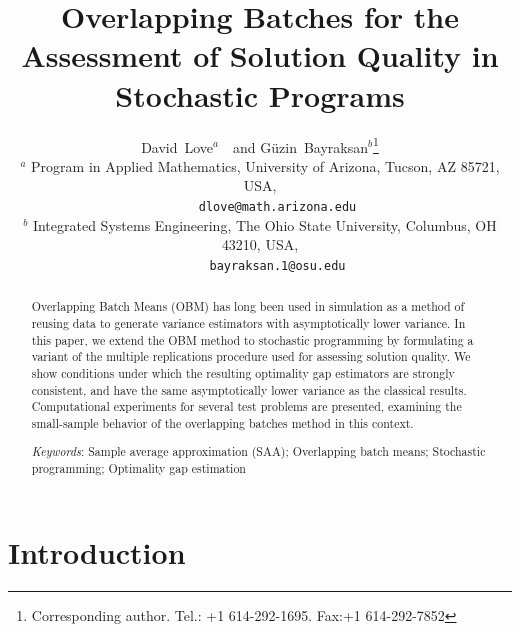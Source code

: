 \documentclass[12pt]{article}
\newcommand{\Keywords}[1]{\par\noindent 
{\small{\em Keywords\/}: #1}}
\begin{document}
\title{Overlapping Batches for the Assessment of Solution Quality in Stochastic Programs}

\author{David~Love$^{a}$\ \ and G\"{u}zin~Bayraksan$^{b}$\thanks{Corresponding author. Tel.: +1 614-292-1695. Fax:+1 614-292-7852}\\[6pt]
{\small
      $^{a}$ Program in Applied Mathematics, University of Arizona, Tucson, AZ 85721, USA,}\\
{\small \ \ \ \ \ \texttt{dlove@math.arizona.edu}} \\
{\small 
      $^{b}$ Integrated Systems Engineering, The Ohio State University, Columbus, OH 43210, USA,}\\
{\small \ \ \ \  \   \texttt{bayraksan.1@osu.edu}}}
\date{}

\maketitle

\begin{abstract}
\noindent Overlapping Batch Means (OBM) has long been used in simulation as a method of reusing data to generate variance estimators with asymptotically lower variance.
In this paper, we extend the OBM method to stochastic programming by formulating a variant of the multiple replications procedure used for assessing solution quality.
We show conditions under which the resulting optimality gap estimators are strongly consistent, and have the same asymptotically lower variance as the classical results.
Computational experiments for several test problems are presented, examining the small-sample behavior of the overlapping batches method in this context.\smallskip

\Keywords{Sample average approximation (SAA); Overlapping batch means;   Stochastic programming; Optimality gap estimation}
\end{abstract}

\section{Introduction}
\label{sec:intro}
\end{document}
